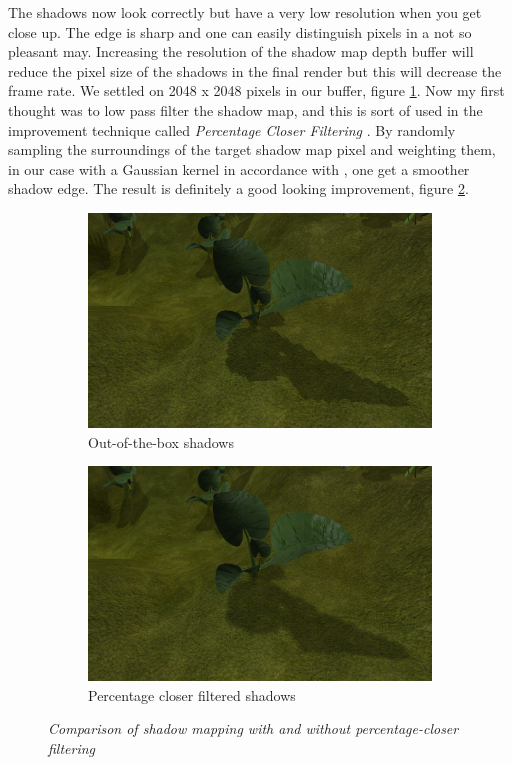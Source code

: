 The shadows now look correctly but have a very low resolution when you get close up. The edge is sharp and one can easily distinguish pixels in a not so pleasant may. Increasing the resolution of the shadow map depth buffer will reduce the pixel size of the shadows in the final render but this will decrease the frame rate. We settled on 2048 x 2048 pixels in our buffer, figure \ref{fig:PCFLvl1}. Now my first thought was to low pass filter the shadow map, and this is sort of used in the improvement technique called \textit{Percentage Closer Filtering} \cite{ShadowMapAntialiasing87}\cite{ShadowMapAntialiasing03}. By randomly sampling the surroundings of the target shadow map pixel and weighting them, in our case with a Gaussian kernel in accordance with \cite{CascadeShadowMapping}, one get a smoother shadow edge. The result is definitely a good looking improvement, figure \ref{fig:PCFLvl5}. 

\begin{figure}[H]
\begin{subfigure}{.5\textwidth}
  \centering
  \includegraphics[width=0.9\linewidth]{images/PCFLvl1.png}
  \caption{Out-of-the-box shadows}
  \label{fig:PCFLvl1}
\end{subfigure}%
\begin{subfigure}{.5\textwidth}
  \centering
  \includegraphics[width=0.9\linewidth]{images/PCFLvl5.png}
  \caption{Percentage closer filtered shadows}
  \label{fig:PCFLvl5}
\end{subfigure}
\caption[Noise comparison]{\textit{Comparison of shadow mapping with and without percentage-closer filtering}}
\label{fig:PCFComparison}
\end{figure}

